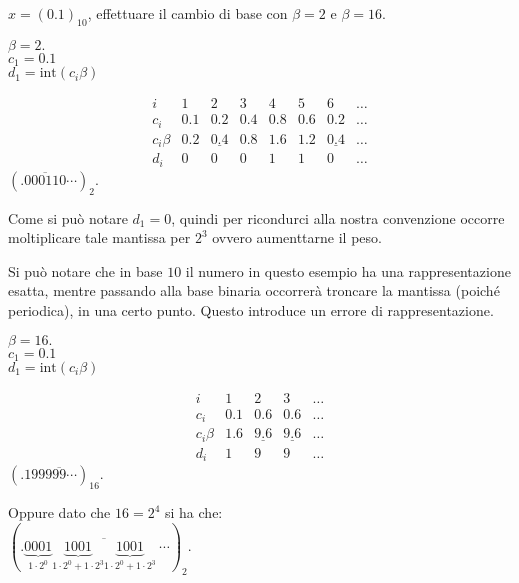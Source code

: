 \begin{ese}
$x = (0.1)_{10}$, effettuare il cambio di base con $\beta = 2$ e $\beta = 16$.
\begin{flushleft}
$\beta = 2.$\\
$c_1 = 0.1$\\
$d_1 = \mathrm{int}(c_i \beta)$
\end{flushleft}
\[
\begin{array}{c|ccccccr}
i        & 1   & 2   & 3   & 4   & 5   & 6   & \ldots \\
\hline
c_i      & 0.1 & 0.2 & 0.4 & 0.8 & 0.6 & 0.2 & \ldots \\
c_i\beta & 0.2 & \underline{0.4} & 0.8 & 1.6 & 1.2 & \underline{0.4} & 
\ldots \\
d_i      & 0   & 0   & 0   & 1   & 1   & 0   & \ldots
\end{array}
\]
$(.0\overline{0011}0\cdots)_2$.

Come si può notare $d_1 = 0$, quindi per ricondurci alla nostra convenzione
occorre moltiplicare tale mantissa per $2^3$ ovvero aumenttarne il peso.

\begin{osse}
Si può notare che in base $10$ il numero in questo esempio ha una 
rappresentazione esatta, mentre passando alla base binaria occorrerà troncare
la mantissa (poiché periodica), in una certo punto. Questo introduce un errore
di rappresentazione.
\end{osse}

\begin{flushleft}
$\beta = 16.$\\
$c_1 = 0.1$\\
$d_1 = \mathrm{int}(c_i \beta)$
\end{flushleft}
\[
\begin{array}{c|cccr}
i        & 1   & 2   & 3   & \ldots \\
\hline
c_i      & 0.1 & 0.6 & 0.6 &  \ldots \\
c_i\beta & 1.6 & \underline{9.6} & \underline{9.6} & 
\ldots \\
d_i      & 1   & 9   & 9   & \ldots
\end{array}
\]
$(.1999\overline{99}\cdots)_{16}$.
\begin{flushleft}
Oppure dato che $16 = 2^4$ si ha che:\\
$(.\underbrace{0001}_{1\cdot 2^0}\overline{\underbrace{1001}_{1\cdot 2^0 + 1\cdot 2^3}
\underbrace{1001}_{1\cdot 2^0 + 1\cdot 2^3}}\ \cdots)_2.$
\end{flushleft}
\end{ese}

